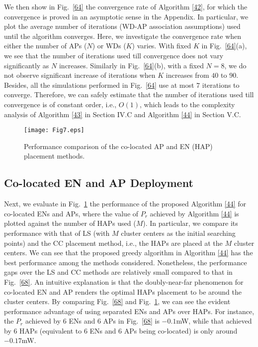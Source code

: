 \documentclass[journal, draftcls, one column, 12pt]{IEEEtran}
\begin{document}
We then show in Fig.~\ref{64} the convergence rate of Algorithm \ref{42}, for which the convergence is proved in an asymptotic sense in the Appendix. In particular, we plot the average number of iterations (WD-AP association assumptions) used until the algorithm converges. Here, we investigate the convergence rate when either the number of APs ($N$) or WDs ($K$) varies. With fixed $K$ in Fig.~\ref{64}(a), we see that the number of iterations used till convergence does not vary significantly as $N$ increases. Similarly in Fig.~\ref{64}(b), with a fixed $N=8$, we do not observe significant increase of iterations when $K$ increases from $40$ to $90$. Besides, all the simulations performed in Fig.~\ref{64} use at most $7$ iterations to converge. Therefore, we can safely estimate that the number of iterations used till convergence is of constant order, i.e., $O(1)$, which leads to the complexity analysis of Algorithm \ref{43} in Section IV.C and Algorithm \ref{44} in Section V.C.

\begin{figure}
\centering
  \begin{center}
    \texttt{[image: Fig7.eps]}
  \end{center}
  \caption{Performance comparison of the co-located AP and EN (HAP) placement methods.}
  \label{69}
\end{figure}


\subsection{Co-located EN and AP Deployment}
Next, we evaluate in Fig.~\ref{69} the performance of the proposed Algorithm \ref{44} for co-located ENs and APs, where the value of $P_r$ achieved by Algorithm \ref{44} is plotted against the number of HAPs used ($M$). In particular, we compare its performance with that of LS (with $M$ cluster centers as the initial searching points) and the CC placement method, i.e., the HAPs are placed at the $M$ cluster centers. We can see that the proposed greedy algorithm in Algorithm \ref{44} has the best performance among the methods considered. Nonetheless, the performance gaps over the LS and CC methods are relatively small compared to that in Fig.~\ref{68}. An intuitive explanation is that the doubly-near-far phenomenon for co-located EN and AP renders the optimal HAPs placement to be around the cluster centers. By comparing Fig.~\ref{68} and Fig.~\ref{69}, we can see the evident performance advantage of using separated ENs and APs over HAPs. For instance, the $P_r$ achieved by $6$ ENs and $6$ APs in Fig.~\ref{68} is $-0.1$mW, while that achieved by $6$ HAPs (equivalent to $6$ ENs and $6$ APs being co-located) is only around $-0.17$mW.
\end{document}
